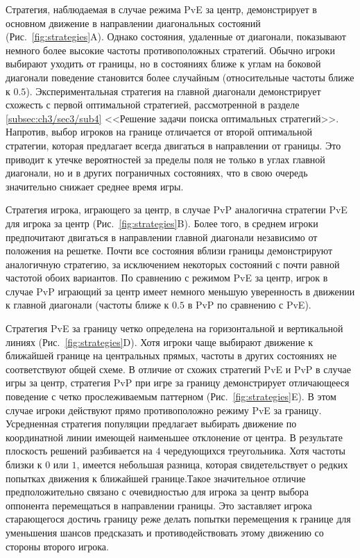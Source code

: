 Стратегия, наблюдаемая в случае режима PvE за центр, демонстрирует в основном движение в направлении диагональных состояний (Рис.~\cref{fig:strategies}A). Однако состояния, удаленные от диагонали, показывают немного более высокие частоты противоположных стратегий. Обычно игроки выбирают уходить от границы, но в состояниях ближе к углам на боковой диагонали поведение становится более случайным (относительные частоты ближе к $0.5$). Экспериментальная стратегия на главной диагонали демонстрирует схожесть с первой оптимальной стратегией, рассмотренной в разделе \cref{subsec:ch3/sec3/sub4} <<Решение задачи поиска оптимальных стратегий>>. Напротив, выбор игроков на границе отличается от второй оптимальной стратегии, которая предлагает всегда двигаться в направлении от границы. Это приводит к утечке вероятностей за пределы поля не только в углах главной диагонали, но и в других пограничных состояниях, что в свою очередь значительно снижает среднее время игры. 

Стратегия игрока, играющего за центр, в случае PvP аналогична стратегии PvE для игрока за центр (Рис.~\cref{fig:strategies}B). Более того, в среднем игроки предпочитают двигаться в направлении главной диагонали независимо от положения на решетке. Почти все состояния вблизи границы демонстрируют аналогичную стратегию, за исключением некоторых состояний с почти равной частотой обоих вариантов. По сравнению с режимом PvE за центр, игрок в случае PvP играющий за центр имеет немного меньшую уверенность в движении к главной диагонали (частоты ближе к $0.5$ в PvP по сравнению с PvE).

Стратегия PvE за границу четко определена на горизонтальной и вертикальной линиях (Рис.~\cref{fig:strategies}D). Хотя игроки чаще выбирают движение к ближайшей границе на центральных прямых, частоты в других состояниях не соответствуют общей схеме. В отличие от схожих стратегий PvE и PvP в случае игры за центр, стратегия PvP при игре за границу демонстрирует отличающееся поведение с четко прослеживаемым паттерном (Рис.~\cref{fig:strategies}E). В этом случае игроки действуют прямо противоположно режиму PvE за границу. Усредненная стратегия популяции предлагает выбирать движение по координатной линии имеющей наименьшее отклонение от центра. В результате плоскость решений разбивается на $4$ чередующихся треугольника. Хотя частоты близки к $0$ или $1$, имеется небольшая разница, которая свидетельствует о редких попытках движения к ближайшей границе.Такое значительное отличие предположительно связано с очевидностью для игрока за центр выбора оппонента перемещаться в направлении границы. Это заставляет игрока старающегося достичь границу реже делать попытки перемещения к границе для уменьшения шансов предсказать и противодействовать этому движению со стороны второго игрока.


